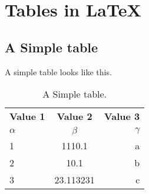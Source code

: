 \documentclass{article}
\begin{document}
\section{Tables in \LaTeX}

\subsection{A Simple table}

A simple table looks like this.

\begin{table}[h!]
    \begin{center}
        \caption{A Simple table.}
        \label{tab:table1}
        \begin{tabular}{l|c|r}                                          %
            \textbf{Value 1} & \textbf{Value 2} & \textbf{Value 3}\\    %
            $\alpha$ & $\beta$ & $\gamma$ \\                            %
            \hline                                                      %
            1 & 1110.1 & a\\                                            %
            2 & 10.1 & b\\                                              %
            3 & 23.113231 & c\\                                         %
        \end{tabular}                                                   %
    \end{center}
\end{table}                                                             %
\end{document}
